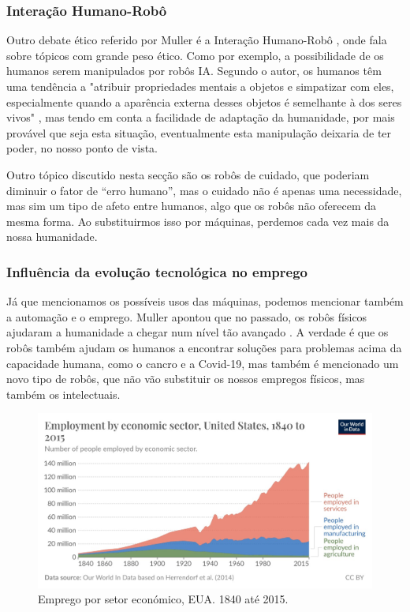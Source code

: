 \documentclass[referee,sn-basic]{sn-jnl}
\theoremstyle{thmstyleone}%
\begin{document}
\subsubsection{Interação Humano-Robô}
\hspace{0.7cm}Outro debate ético referido por Muller é a Interação Humano-Robô \cite{sep-ethics-ai}, onde fala sobre tópicos com grande peso ético. Como por exemplo, a possibilidade de os humanos serem manipulados por robôs IA. Segundo o autor, os humanos têm uma tendência a "atribuir propriedades mentais a objetos e simpatizar com eles, especialmente quando a aparência externa desses objetos é semelhante à dos seres vivos" \cite{sep-ethics-ai}, mas tendo em conta a facilidade de adaptação da humanidade, por mais provável que seja esta situação, eventualmente esta manipulação deixaria de ter poder, no nosso ponto de vista.\par

Outro tópico discutido nesta secção são os robôs de cuidado, que poderiam diminuir o fator de “erro humano”, mas o cuidado não é apenas uma necessidade, mas sim um tipo de afeto entre humanos, algo que os robôs não oferecem da mesma forma. Ao substituirmos isso por máquinas, perdemos cada vez mais da nossa humanidade.


\subsubsection{Influência da evolução tecnológica no emprego}
\hspace{0.7cm}Já que mencionamos os possíveis usos das máquinas, podemos mencionar também a automação e o emprego. Muller apontou que no passado, os robôs físicos ajudaram a humanidade a chegar num nível tão avançado \cite{sep-ethics-ai}. A verdade é que os robôs também ajudam os humanos a encontrar soluções para problemas acima da capacidade humana, como o cancro e a Covid-19, mas também é mencionado um novo tipo de robôs, que não vão substituir os nossos empregos físicos, mas também os intelectuais.\par
\begin{figure}[h]
    \centering
    \includegraphics[width=1.\textwidth]{employing.jpg}
    \caption{Emprego por setor económico, EUA. 1840 até 2015.}
     \label{fig:employ}
\end{figure}
\end{document}
